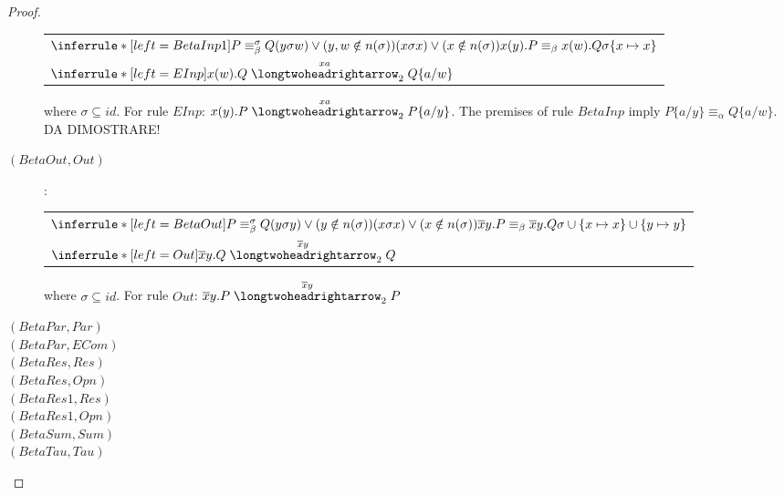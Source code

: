 \begin{lemma}
\begin{proof}
\begin{description}
\begin{center}
\begin{tabular}{l}
	      $\inferrule*[left=BetaInp1]{
		  P\equiv_{\beta}^{\sigma}Q
		\\
		  (y \sigma w) \vee (y,w\notin n(\sigma))
		\\
		  (x \sigma x) \vee (x\notin n(\sigma))
	      }{
		  x(y).P\equiv_{\beta}x(w).Q
		\\
		  \sigma \{x\mapsto x\}
	      }$
	    \\
	      $\inferrule*[left=EInp]{
	      }{
		  x(w).Q \stackrel{xa}{\longtwoheadrightarrow}_{2} Q\{a/w\}
	      }$	      
	  \\
	  \end{tabular}
	\end{center}
	where $\sigma \subseteq id$. For rule $EInp$: $x(y).P \stackrel{xa}{\longtwoheadrightarrow}_{2} P\{a/y\}$. The premises of rule $BetaInp$ imply $P\{a/y\} \equiv_{\alpha} Q\{a/w\}$. DA DIMOSTRARE!
      \item[$(BetaOut, Out)$]:
	\begin{center}
	  \begin{tabular}{l}
	      $\inferrule*[left=BetaOut]{
		  P\equiv_{\beta}^{\sigma}Q
		\\
		  (y \sigma y) \vee (y\notin n(\sigma))
		\\
		  (x \sigma x) \vee (x\notin n(\sigma))
	      }{
		  \overline{x}y.P\equiv_{\beta} \overline{x}y.Q
		\\
		  \sigma \cup \{x\mapsto x\} \cup \{y\mapsto y\}
	      }$
	    \\
	      $\inferrule*[left=Out]{
	      }{
		  \overline{x}y.Q \stackrel{\overline{x}y}{\longtwoheadrightarrow}_{2} Q
	      }$	      
	  \\
	  \end{tabular}
	\end{center}
	where $\sigma \subseteq id$. For rule $Out$: $\overline{x}y.P \stackrel{\overline{x}y}{\longtwoheadrightarrow}_{2} P$ 
      \item[$(BetaPar, Par)$]
      \item[$(BetaPar, ECom)$]
      \item[$(BetaRes, Res)$]
      \item[$(BetaRes, Opn)$]
      \item[$(BetaRes1, Res)$]
      \item[$(BetaRes1, Opn)$]
      \item[$(BetaSum, Sum)$]
      \item[$(BetaTau, Tau)$]
    \end{description}
  \end{proof}
\end{lemma}

